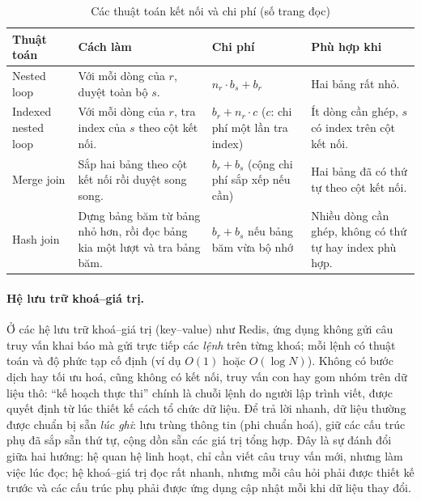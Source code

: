 \begin{table}[H]
    \centering
    \caption{Các thuật toán kết nối và chi phí (số trang đọc)}
    \label{tab:join-algorithms}
    \begin{tabularx}{\textwidth}{>{\raggedright\arraybackslash}p{2.6cm} X >{\raggedright\arraybackslash}p{2.7cm} >{\raggedright\arraybackslash}p{3.4cm}}
        \toprule
        \textbf{Thuật toán} & \textbf{Cách làm} & \textbf{Chi phí} & \textbf{Phù hợp khi} \\
        \midrule
        Nested loop & Với mỗi dòng của $r$, duyệt toàn bộ $s$. & $n_r \cdot b_s + b_r$ & Hai bảng rất nhỏ. \\
        \addlinespace
        Indexed nested loop & Với mỗi dòng của $r$, tra index của $s$ theo cột kết nối. & $b_r + n_r \cdot c$ ($c$: chi phí một lần tra index) & Ít dòng cần ghép, $s$ có index trên cột kết nối. \\
        \addlinespace
        Merge join & Sắp hai bảng theo cột kết nối rồi duyệt song song. & $b_r + b_s$ (cộng chi phí sắp xếp nếu cần) & Hai bảng đã có thứ tự theo cột kết nối. \\
        \addlinespace
        Hash join & Dựng bảng băm từ bảng nhỏ hơn, rồi đọc bảng kia một lượt và tra bảng băm. & $b_r + b_s$ nếu bảng băm vừa bộ nhớ & Nhiều dòng cần ghép, không có thứ tự hay index phù hợp. \\
        \bottomrule
    \end{tabularx}
\end{table}

\paragraph{Hệ lưu trữ khoá--giá trị.}
Ở các hệ lưu trữ khoá--giá trị (key--value) như Redis, ứng dụng không gửi câu truy vấn khai báo mà gửi trực tiếp các \textit{lệnh} trên từng khoá; mỗi lệnh có thuật toán và độ phức tạp cố định (ví dụ $O(1)$ hoặc $O(\log N)$). Không có bước dịch hay tối ưu hoá, cũng không có kết nối, truy vấn con hay gom nhóm trên dữ liệu thô: ``kế hoạch thực thi'' chính là chuỗi lệnh do người lập trình viết, được quyết định từ lúc thiết kế cách tổ chức dữ liệu. Để trả lời nhanh, dữ liệu thường được chuẩn bị sẵn \textit{lúc ghi}: lưu trùng thông tin (phi chuẩn hoá), giữ các cấu trúc phụ đã sắp sẵn thứ tự, cộng dồn sẵn các giá trị tổng hợp. Đây là sự đánh đổi giữa hai hướng: hệ quan hệ linh hoạt, chỉ cần viết câu truy vấn mới, nhưng làm việc lúc đọc; hệ khoá--giá trị đọc rất nhanh, nhưng mỗi câu hỏi phải được thiết kế trước và các cấu trúc phụ phải được ứng dụng cập nhật mỗi khi dữ liệu thay đổi.


